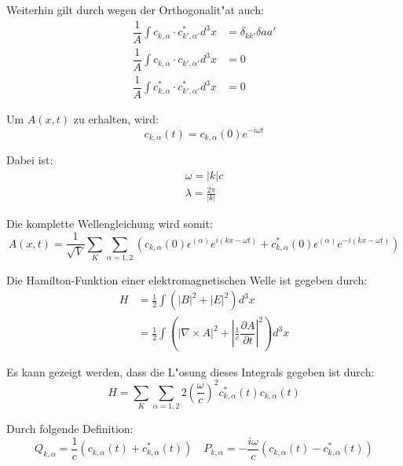 Weiterhin gilt durch wegen der Orthogonalit"at auch:
\begin{equation}
\begin{split}
\dfrac{1}{A} \int c_{k,\alpha} \cdot c^*_{k',\alpha'} d^3 x &= \delta_{kk'}\delta{aa'} \\
\dfrac{1}{A} \int c_{k,\alpha} \cdot c_{k',\alpha'} d^3 x &= 0 \\
\dfrac{1}{A} \int c^*_{k,\alpha} \cdot c^*_{k',\alpha'} d^3 x &= 0
\end{split}
\end{equation}

Um $A(x,t)$ zu erhalten, wird:
\begin{equation}
c_{k,\alpha}(t) = c_{k,\alpha}(0) e^{-i \omega t}
\end{equation}

Dabei ist:
\begin{equation}
\begin{split}
\omega=|k|c \\
\lambda = \frac{2 \pi}{|k|}
\end{split}
\end{equation}

Die komplette Wellengleichung wird somit:
\begin{equation}
A(x,t) = \frac{1}{\sqrt{V}} \sum_K \sum_{\alpha=1,2} (c_{k,\alpha}(0) \epsilon^{(\alpha)} e^{i (kx - \omega t)} + c^*_{k,\alpha}(0) \epsilon^{(\alpha)} e^{-i(kx - \omega t)})
\end{equation}

Die Hamilton-Funktion einer elektromagnetischen Welle ist gegeben durch:
\begin{equation}
\begin{split}
H &= \frac{1}{2} \int (|B|^2 + |E|^2) d^3 x \\
	&= \frac{1}{2} \int (| \nabla\times A |^2 + \left| \frac{1}{c} \dfrac{\partial A}{\partial t} \right|^2) d^3 x 
\end{split}
\end{equation}

Es kann gezeigt werden, dass die L"osung dieses Integrals gegeben ist durch:
\begin{equation}
H = \sum_K \sum_{\alpha=1,2} 2 \left(\frac{\omega}{c}\right)^2 c^*_{k,\alpha}(t) c_{k,\alpha}(t)
\end{equation}

Durch folgende Definition:
\begin{equation}
Q_{k,\alpha} = \frac{1}{c}(c_{k,\alpha}(t) + c^*_{k,\alpha}(t)) \quad P_{k,\alpha} = -\frac{i\omega}{c}(c_{k,\alpha}(t) - c^*_{k,\alpha}(t)) 
\end{equation}

